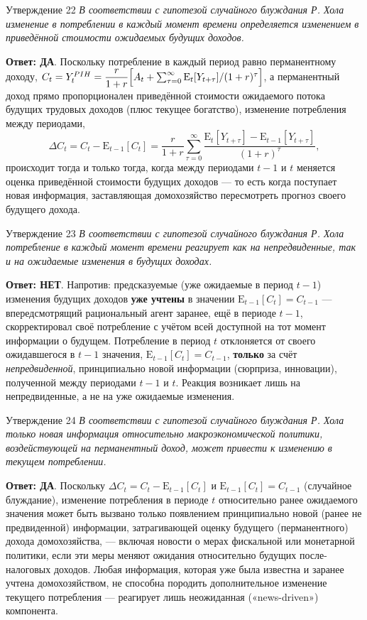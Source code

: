 \documentclass[10pt,a4paper]{article}
\newcommand{\qda}{\textbf{\color{yesgreen}Ответ: ДА}}
\newcommand{\qnet}{\textbf{\color{nored}Ответ: НЕТ}}
\newenvironment{answer}[2]{%
  \begin{qbox}{Утверждение #1}
  \textit{#2}\par\smallskip
}{%
  \end{qbox}\vspace{2pt}
}
\begin{document}
\begin{answer}{22}{В соответствии с гипотезой случайного блуждания Р. Хола изменение в потреблении в каждый момент времени определяется изменением в приведённой стоимости ожидаемых будущих доходов.}
\qda. Поскольку потребление в каждый период равно перманентному доходу, $C_t=Y_t^{PIH}=\dfrac{r}{1+r}\Bigl[A_t+\sum_{\tau=0}^{\infty}\mathrm{E}_t[Y_{t+\tau}]/(1+r)^\tau\Bigr]$, а перманентный доход прямо пропорционален приведённой стоимости ожидаемого потока будущих трудовых доходов (плюс текущее богатство), изменение потребления между периодами,
\[
\Delta C_t = C_t - \mathrm{E}_{t-1}[C_t] = \frac{r}{1+r}\sum_{\tau=0}^{\infty}\frac{\mathrm{E}_t[Y_{t+\tau}]-\mathrm{E}_{t-1}[Y_{t+\tau}]}{(1+r)^\tau},
\]
происходит тогда и только тогда, когда между периодами $t-1$ и $t$ меняется оценка приведённой стоимости будущих доходов — то есть когда поступает новая информация, заставляющая домохозяйство пересмотреть прогноз своего будущего дохода.
\end{answer}
 
\begin{answer}{23}{В соответствии с гипотезой случайного блуждания Р. Хола потребление в каждый момент времени реагирует как на непредвиденные, так и на ожидаемые изменения в будущих доходах.}
\qnet. Напротив: предсказуемые (уже ожидаемые в период $t-1$) изменения будущих доходов \textbf{уже учтены} в значении $\mathrm{E}_{t-1}[C_t]=C_{t-1}$ — впередсмотрящий рациональный агент заранее, ещё в периоде $t-1$, скорректировал своё потребление с учётом всей доступной на тот момент информации о будущем. Потребление в период $t$ отклоняется от своего ожидавшегося в $t-1$ значения, $\mathrm{E}_{t-1}[C_t]=C_{t-1}$, \textbf{только} за счёт \emph{непредвиденной}, принципиально новой информации (сюрприза, инновации), полученной между периодами $t-1$ и $t$. Реакция возникает лишь на непредвиденные, а не на уже ожидаемые изменения.
\end{answer}
 
\begin{answer}{24}{В соответствии с гипотезой случайного блуждания Р. Хола только новая информация относительно макроэкономической политики, воздействующей на перманентный доход, может привести к изменению в текущем потреблении.}
\qda. Поскольку $\Delta C_t=C_t-\mathrm{E}_{t-1}[C_t]$ и $\mathrm{E}_{t-1}[C_t]=C_{t-1}$ (случайное блуждание), изменение потребления в периоде $t$ относительно ранее ожидаемого значения может быть вызвано только появлением принципиально новой (ранее не предвиденной) информации, затрагивающей оценку будущего (перманентного) дохода домохозяйства, — включая новости о мерах фискальной или монетарной политики, если эти меры меняют ожидания относительно будущих после-налоговых доходов. Любая информация, которая уже была известна и заранее учтена домохозяйством, не способна породить дополнительное изменение текущего потребления — реагирует лишь неожиданная («news-driven») компонента.
\end{answer}
 
\end{document}
